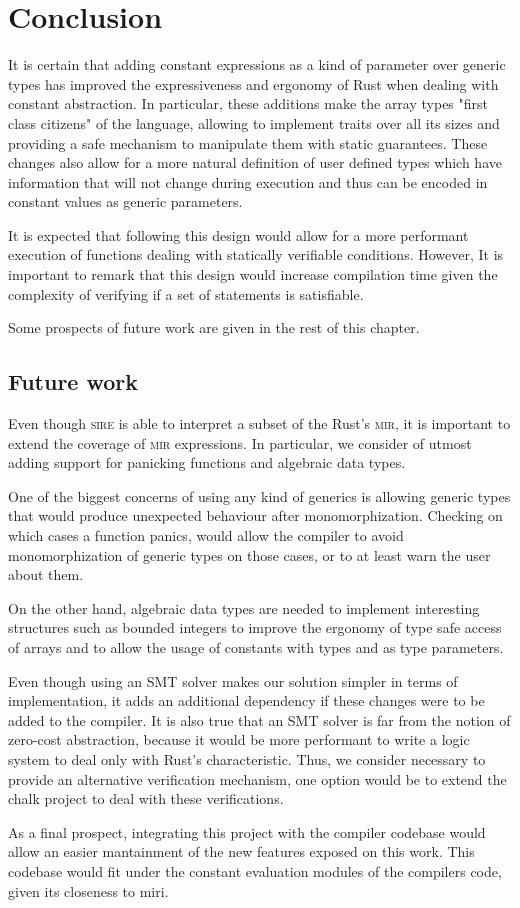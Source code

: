 \chapter{Conclusion}
\label{chap:conclusion}

It is certain that adding constant expressions as a kind of parameter over
generic types has improved the expressiveness and ergonomy of Rust when dealing
with constant abstraction. In particular, these additions make the array types
"first class citizens" of the language, allowing to implement traits over all
its sizes and providing a safe mechanism to manipulate them with static
guarantees. These changes also allow for a more natural definition of user
defined types which have information that will not change during execution and
thus can be encoded in constant values as generic parameters.

It is expected that following this design would allow for a more performant
execution of functions dealing with statically verifiable conditions. However,
It is important to remark that this design would increase compilation time
given the complexity of verifying if a set of statements is satisfiable.

Some prospects of future work are given in the rest of this chapter.


\section{Future work}
\label{sec:future_work}

Even though \textsc{sire} is able to interpret a subset of the Rust's
\textsc{mir}, it is important to extend the coverage of \textsc{mir}
expressions. In particular, we consider of utmost adding support for panicking
functions and algebraic data types.

One of the biggest concerns of using any kind of generics is allowing generic
types that would produce unexpected behaviour after monomorphization. Checking
on which cases a function panics, would allow the compiler to avoid
monomorphization of generic types on those cases, or to at least warn the user
about them.

On the other hand, algebraic data types are needed to implement interesting
structures such as bounded integers to improve the ergonomy of type safe access
of arrays and to allow the usage of constants with types  and
 as type parameters.

Even though using an SMT solver makes our solution simpler in terms of
implementation, it adds an additional dependency if these changes were to be
added to the compiler. It is also true that an SMT solver is far from the
notion of zero-cost abstraction, because it would be more performant to write a
logic system to deal only with Rust's characteristic. Thus, we consider
necessary to provide an alternative verification mechanism, one option would be
to extend the chalk project to deal with these verifications.

As a final prospect, integrating this project with the compiler codebase would
allow an easier mantainment of the new features exposed on this work. This
codebase would fit under the constant evaluation modules of the compilers code,
given its closeness to miri.

